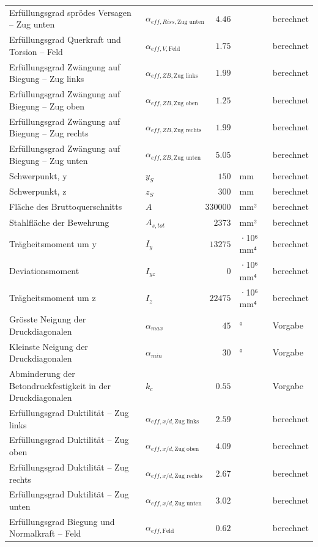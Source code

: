 \documentclass[11pt,a4paper]{article}
\begin{document}
\begin{xltabular}{\linewidth}{>{\raggedright\arraybackslash}Xlrll}
Erfüllungsgrad sprödes Versagen – Zug unten & $\alpha_{eff,Riss,\text{Zug unten}}$ & $4.46$ &  & berechnet \\
Erfüllungsgrad Querkraft und Torsion – Feld & $\alpha_{eff,V,\text{Feld}}$ & $1.75$ &  & berechnet \\
Erfüllungsgrad Zwängung auf Biegung – Zug links & $\alpha_{eff,ZB,\text{Zug links}}$ & $1.99$ &  & berechnet \\
Erfüllungsgrad Zwängung auf Biegung – Zug oben & $\alpha_{eff,ZB,\text{Zug oben}}$ & $1.25$ &  & berechnet \\
Erfüllungsgrad Zwängung auf Biegung – Zug rechts & $\alpha_{eff,ZB,\text{Zug rechts}}$ & $1.99$ &  & berechnet \\
Erfüllungsgrad Zwängung auf Biegung – Zug unten & $\alpha_{eff,ZB,\text{Zug unten}}$ & $5.05$ &  & berechnet \\
Schwerpunkt, y & $y_S$ & $150$ & mm & berechnet \\
Schwerpunkt, z & $z_S$ & $300$ & mm & berechnet \\
Fläche des Bruttoquerschnitts & $A$ & $330000$ & mm² & berechnet \\
Stahlfläche der Bewehrung & $A_{s,tot}$ & $2373$ & mm² & berechnet \\
Trägheitsmoment um y & $I_y$ & $13275$ & ·10⁶ mm⁴ & berechnet \\
Deviationsmoment & $I_{yz}$ & $0$ & ·10⁶ mm⁴ & berechnet \\
Trägheitsmoment um z & $I_z$ & $22475$ & ·10⁶ mm⁴ & berechnet \\
Grösste Neigung der Druckdiagonalen & $\alpha_{max}$ & $45$ & ° & Vorgabe \\
Kleinste Neigung der Druckdiagonalen & $\alpha_{min}$ & $30$ & ° & Vorgabe \\
Abminderung der Betondruckfestigkeit in der Druckdiagonalen & $k_c$ & $0.55$ &  & Vorgabe \\
Erfüllungsgrad Duktilität – Zug links & $\alpha_{eff,x/d,\text{Zug links}}$ & $2.59$ &  & berechnet \\
Erfüllungsgrad Duktilität – Zug oben & $\alpha_{eff,x/d,\text{Zug oben}}$ & $4.09$ &  & berechnet \\
Erfüllungsgrad Duktilität – Zug rechts & $\alpha_{eff,x/d,\text{Zug rechts}}$ & $2.67$ &  & berechnet \\
Erfüllungsgrad Duktilität – Zug unten & $\alpha_{eff,x/d,\text{Zug unten}}$ & $3.02$ &  & berechnet \\
Erfüllungsgrad Biegung und Normalkraft – Feld & $\alpha_{eff,\text{Feld}}$ & $0.62$ &  & berechnet \\

\end{xltabular}
\end{document}
